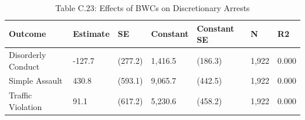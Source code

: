 \begin{table}

\caption{Table C.23: Effects of BWCs on Discretionary Arrests}
\centering
\begin{tabular}[t]{lllllll}
\toprule
Outcome & Estimate & SE & Constant & Constant SE & N & R2\\
\midrule
Disorderly Conduct & -127.7 & (277.2) & 1,416.5 & (186.3) & 1,922 & 0.000\\
Simple Assault & 430.8 & (593.1) & 9,065.7 & (442.5) & 1,922 & 0.000\\
Traffic Violation & 91.1 & (617.2) & 5,230.6 & (458.2) & 1,922 & 0.000\\
\bottomrule
\end{tabular}
\end{table}
